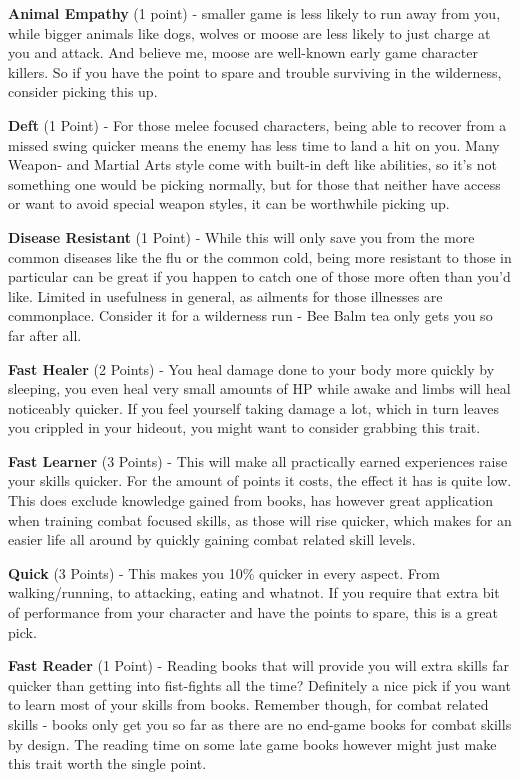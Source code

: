 \textbf{Animal Empathy} (1 point) - smaller game is less likely to run away from you, while bigger animals like dogs, wolves or moose are less likely to just charge at you and attack. And believe me, moose are well-known early game character killers. So if you have the point to spare and trouble surviving in the wilderness, consider picking this up.

\textbf{Deft} (1 Point) - For those melee focused characters, being able to recover from a missed swing quicker means the enemy has less time to land a hit on you. Many Weapon- and Martial Arts style come with built-in deft like abilities, so it's not something one would be picking normally, but for those that neither have access or want to avoid special weapon styles, it can be worthwhile picking up.

\textbf{Disease Resistant} (1 Point) - While this will only save you from the more common diseases like the flu or the common cold, being more resistant to those in particular can be great if you happen to catch one of those more often than you'd like. Limited in usefulness in general, as ailments for those illnesses are commonplace. Consider it for a wilderness run - Bee Balm tea only gets you so far after all.

\textbf{Fast Healer} (2 Points) - You heal damage done to your body more quickly by sleeping, you even heal very small amounts of HP while awake and limbs will heal noticeably quicker. If you feel yourself taking damage a lot, which in turn leaves you crippled in your hideout, you might want to consider grabbing this trait.

\textbf{Fast Learner} (3 Points) - This will make all practically earned experiences raise your skills quicker. For the amount of points it costs, the effect it has is quite low. This does exclude knowledge gained from books, has however great application when training combat focused skills, as those will rise quicker, which makes for an easier life all around by quickly gaining combat related skill levels.

\textbf{Quick} (3 Points) - This makes you 10\% quicker in every aspect. From walking/running, to attacking, eating and whatnot. If you require that extra bit of performance from your character and have the points to spare, this is a great pick.

\textbf{Fast Reader} (1 Point) - Reading books that will provide you will extra skills far quicker than getting into fist-fights all the time? Definitely a nice pick if you want to learn most of your skills from books. Remember though, for combat related skills - books only get you so far as there are no end-game books for combat skills by design. The reading time on some late game books however might just make this trait worth the single point.


